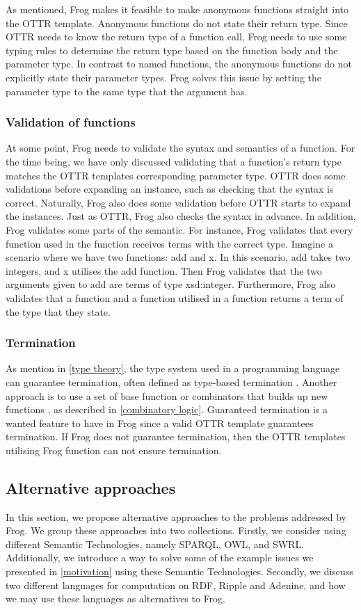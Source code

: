 \para 
As mentioned, Frog makes it feasible to make anonymous functions straight into the OTTR template. Anonymous functions do not state their return type. Since OTTR needs to know the return type of a function call, Frog needs to use some typing rules to determine the return type based on the function body and the parameter type. In contrast to named functions, the anonymous functions do not explicitly state their parameter types. Frog solves this issue by setting the parameter type to the same type that the argument has. 

\subsubsection{Validation of functions}
At some point, Frog needs to validate the syntax and semantics of a function. For the time being, we have only discussed validating that a function's return type matches the OTTR templates corresponding parameter type. OTTR does some validations before expanding an instance, such as checking that the syntax is correct. Naturally, Frog also does some validation before OTTR starts to expand the instances. Just as OTTR, Frog also checks the syntax in advance. In addition, Frog validates some parts of the semantic. For instance, Frog validates that every function used in the function receives terms with the correct type. Imagine a scenario where we have two functions: add and x. In this scenario, add takes two integers, and x utilises the add function. Then Frog validates that the two arguments given to add are terms of type xsd:integer. Furthermore, Frog also validates that a function and a function utilised in a function returns a term of the type that they state.

\subsubsection{Termination}
As mention in \autoref{type theory}, the type system used in a programming language can guarantee termination, often defined as type-based termination \autocite{TypeTermination}. Another approach is to use a set of base function or combinators that builds up new functions \autocite{TypeTermination}, as described in \autoref{combinatory logic}. Guaranteed termination is a wanted feature to have in Frog since a valid OTTR template guarantees termination. If Frog does not guarantee termination, then the OTTR templates utilising Frog function can not ensure termination. 


\subsection{Alternative approaches}
In this section, we propose alternative approaches to the problems addressed by Frog. We group these approaches into two collections. Firstly, we consider using different Semantic Technologies, namely SPARQL, OWL, and SWRL. Additionally, we introduce a way to solve some of the example issues we presented in \autoref{motivation} using these Semantic Technologies. Secondly, we discuss two different languages for computation on RDF, Ripple and Adenine, and how we may use these languages as alternatives to Frog.

